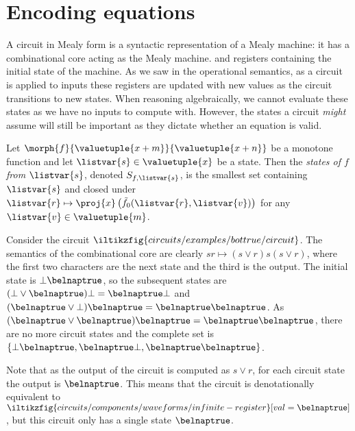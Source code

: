 \section{Encoding equations}\label{sec:encoding}

A circuit in Mealy form is a syntactic representation of a Mealy machine: it
has a combinational core acting as the Mealy machine. and registers containing
the initial state of the machine.
As we saw in the operational semantics, as a circuit is applied to inputs these
registers are updated with new values as the circuit transitions to new states.
When reasoning algebraically, we cannot evaluate these states as we have no
inputs to compute with.
However, the states a circuit \emph{might} assume will still be important as
they dictate whether an equation is valid.

\begin{definition}[States]
    Let \(\morph{f}{\valuetuple{x+m}}{\valuetuple{x+n}}\) be a
    monotone function and let \(\listvar{s} \in  \valuetuple{x}\) be a state.
    Then the \emph{states of \(f\) from \(\listvar{s}\)}, denoted
    \(S_{f,\listvar{s}}\), is the smallest set containing \(\listvar{s}\) and
    closed under \(
    \listvar{r}
    \mapsto
    \proj{x}\left(\tilde{f}_0(\listvar{r},\listvar{v})\right)
    \) for any \(\listvar{v} \in \valuetuple{m}\).
\end{definition}

\begin{example}\label{ex:circuit-states}
    Consider the circuit \(
    \iltikzfig{circuits/examples/bottrue/circuit}
    \).
    The semantics of the combinational core are clearly
    \(sr \mapsto (s \lor r)s(s \lor r)\), where the first two characters are the
    next state and the third is the output.
    The initial state is \(\bot\belnaptrue\), so the subsequent states are
    \((\bot \lor \belnaptrue)\bot = \belnaptrue\bot\) and
    \((\belnaptrue \lor \bot)\belnaptrue = \belnaptrue\belnaptrue\).
    As \((\belnaptrue \lor \belnaptrue)\belnaptrue = \belnaptrue\belnaptrue\),
    there are no more circuit states and the complete set is
    \(\{\bot\belnaptrue,\belnaptrue\bot,\belnaptrue\belnaptrue\}\).

    Note that as the output of the circuit is computed as \(s \lor r\), for each
    circuit state the output is \(\belnaptrue\).
    This means that the circuit is denotationally equivalent to \(
    \iltikzfig{circuits/components/waveforms/infinite-register}[val=\belnaptrue]
    \), but this circuit only has a single state \(\belnaptrue\).
\end{example}

